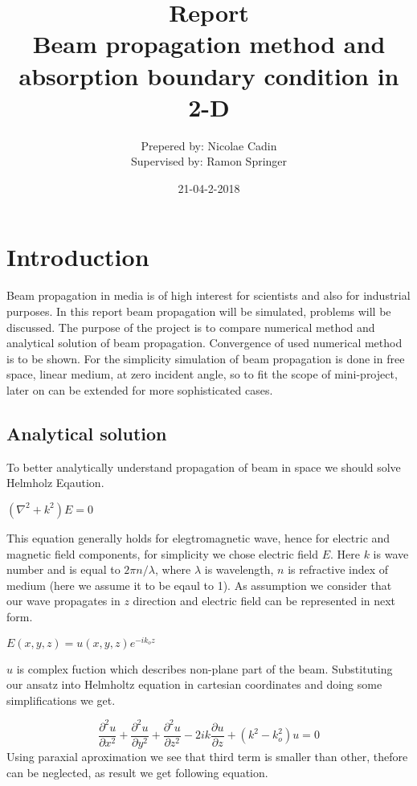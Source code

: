 \documentclass{article}
\title{Report\\Beam propagation method and absorption boundary condition in 2-D}
\date{21-04-2-2018}
\author{Prepered by: Nicolae Cadin \\Supervised by: Ramon Springer}
\begin{document}
	
	
	\maketitle
	\newpage
	\tableofcontents
	
	\newpage
	\section{Introduction}
	Beam propagation in media is of high interest for scientists and also for industrial purposes. 
	In this report beam propagation will be simulated, problems will be discussed. The purpose of the project is to compare numerical method and analytical solution of beam propagation. Convergence of used numerical method is to be shown. For the simplicity simulation of beam propagation is done in free space, linear medium, at zero incident angle, so to fit the scope of mini-project, later on can be extended for more sophisticated cases.
	\subsection{Analytical solution}
	To better analytically understand propagation of beam in space we should solve Helmholz Eqaution.
	\begin{center}
		$(\nabla^2+k^2)E = 0$		
	\end{center}
	This equation generally holds for elegtromagnetic wave, hence for electric and magnetic field components, for simplicity we chose electric field $E$. Here $k$ is wave number and is equal to $2\pi n/\lambda$, where $\lambda$ is wavelength, $n$ is refractive index of medium (here we assume it to be eqaul to 1). As assumption we consider that our wave propagates in $z$ direction and electric field can be represented in next form.
	\begin{center}
		$E(x,y,z)=u(x,y,z)e^{-ik_oz}$
	\end{center}
	$u$ is complex fuction which describes non-plane part of the beam. Substituting our ansatz into Helmholtz equation in cartesian coordinates and doing some simplifications we get.

	\[\frac{\partial^2 u}{\partial x^2}+ \frac{\partial^2 u}{\partial y^2}+ \frac{\partial^2 u}{\partial z^2} - 2ik\frac{\partial u}{\partial z}+(k^2-k_o^2)u=0\]
	Using paraxial aproximation we see that third term is smaller than other, thefore can be neglected, as result we get following equation.
	
\end{document}
